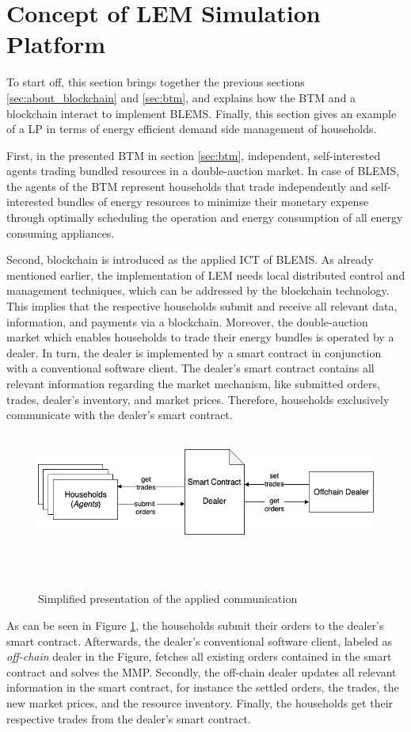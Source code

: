 \section{Concept of LEM Simulation Platform}
\label{sec:concept_of_lem}
To start off, this section brings together the previous sections \ref{sec:about_blockchain} and \ref{sec:btm},
and explains how the BTM and a blockchain interact to implement BLEMS.
Finally, this section gives an example of a LP in terms of energy efficient demand side management of households. 

First, in the presented BTM in section \ref{sec:btm}, independent, self-interested agents trading bundled resources
in a double-auction market. 
In case of BLEMS, the agents of the BTM represent households that 
trade independently and self-interested bundles of energy resources to minimize their monetary expense 
through optimally scheduling the operation and energy consumption 
of all energy consuming appliances.

Second, blockchain is introduced as the applied ICT of BLEMS. 
As already mentioned earlier, the implementation of LEM needs local distributed control and 
management techniques, which can be addressed by the blockchain technology.
This implies that the respective households submit and receive all relevant data, information, and payments via a blockchain. 
Moreover, the double-auction market which enables households to trade their energy bundles is operated by a dealer.
In turn, the dealer is implemented by a smart contract in conjunction with a conventional software client. 
The dealer's smart contract contains all relevant information regarding the market mechanism, like submitted orders, trades, 
dealer's inventory, and market prices. 
Therefore, households exclusively communicate with the dealer's smart contract. 

\begin{figure}[htbp]
    \centering
    \includegraphics[width=.7\linewidth]{./figures/concept_lem.png}
    \caption{Simplified presentation of the applied communication}
    \label{figure:concept_lem}
\end{figure}

As can be seen in Figure \ref{figure:concept_lem}, the households submit their orders to the dealer's smart contract. 
Afterwards, the dealer's conventional software client, labeled as \textit{off-chain} dealer in the Figure, fetches all existing orders contained in the smart contract
and solves the MMP.
Secondly, the off-chain dealer updates all relevant information in the smart contract, for instance 
the settled orders, the trades, the new market prices, and the resource inventory.
Finally, the households get their respective trades from the dealer's smart contract. 

